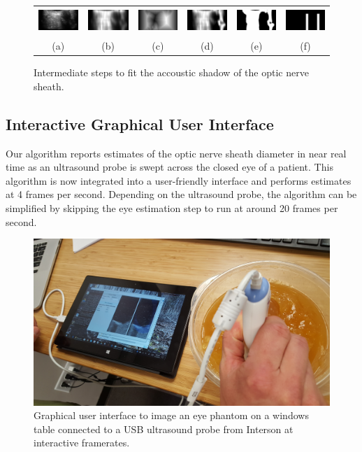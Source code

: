 \documentclass{llncs}
\begin{document}
\begin{figure}
\centering
\begin{tabular}{cccccc}
\includegraphics[height=0.36in]{019-nerve.png} &
\includegraphics[height=0.37in]{019-nerve-smooth.png} &
\includegraphics[height=0.36in]{019-nerve-distance.png} &
\includegraphics[height=0.36in]{019-nerve-scaled.png} &
\includegraphics[height=0.36in]{019-nerve-thres.png} &         
\includegraphics[height=0.36in]{019-nerve-moving.png} \\         
(a) & (b) & (c) & (d) & (e) & (f)
\end{tabular}
\caption{
\label{fig:algorithm-nerve}
Intermediate steps to fit the accoustic shadow of the optic nerve sheath.
}
\end{figure}

\subsection{Interactive Graphical User Interface}
Our algorithm reports estimates of the optic nerve sheath diameter in near real
time as an ultrasound probe is swept across the closed eye of a patient. 
This algorithm is now integrated into a user-friendly interface and performs
estimates at 4 frames per second. Depending on the ultrasound probe, the
algorithm can be simplified by skipping the eye estimation step to run at
around 20 frames per second.
\begin{figure}
\centering
\includegraphics[width=0.85\linewidth]{gui.jpg} 
\caption{
\label{fig:gui}
Graphical user interface to image an eye phantom on a windows table connected to
a USB ultrasound probe from Interson at interactive framerates. 
}
\end{figure}
\end{document}
